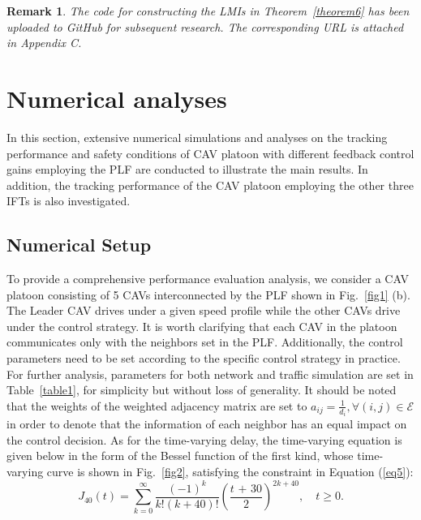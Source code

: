 \documentclass[a4paper]{cas-sc}
\newtheorem{remark}[theorem]{Remark}
\begin{document}
\begin{remark}
  \label{remark7}
  The code for constructing the LMIs in Theorem~\ref{theorem6} has been uploaded to GitHub for subsequent research. The corresponding URL is attached in Appendix C.
\end{remark}

\section{Numerical analyses}
\label{Section 5}
In this section, extensive numerical simulations and analyses on the tracking performance and safety conditions of CAV platoon with different feedback control gains employing the PLF are conducted to illustrate the main results. In addition, the tracking performance of the CAV platoon employing the other three IFTs is also investigated.

\subsection{Numerical Setup}
\label{Section 5.1}
To provide a comprehensive performance evaluation analysis, we consider a CAV platoon consisting of 5 CAVs interconnected by the PLF shown in Fig.~\ref{fig1} (b). The Leader CAV drives under a given speed profile while the other CAVs drive under the control strategy. It is worth clarifying that each CAV in the platoon communicates only with the neighbors set in the PLF. Additionally, the control parameters need to be set according to the specific control strategy in practice. For further analysis, parameters for both network and traffic simulation are set in Table~\ref{table1}, for simplicity but without loss of generality. It should be noted that the weights of the weighted adjacency matrix are set to $ {a_{ij}} = \frac{1}{{{d_i}}},\forall (i,j) \in \mathcal{E} $ in order to denote that the information of each neighbor has an equal impact on the control decision. As for the time-varying delay, the time-varying equation is given below in the form of the Bessel function of the first kind, whose time-varying curve is shown in Fig.~\ref{fig2}, satisfying the constraint in Equation (\ref{eq5}):
\begin{equation}
  \label{eq51}
  {J_{40}}(t) = \sum\limits_{k = 0}^\infty  {\frac{{{{( - 1)}^k}}}{{k!(k + 40)!}}} {\left( {\frac{{t{\text{ + }}30}}{2}} \right)^{2k + 40}},\quad t \geqslant 0.
\end{equation}
\end{document}
